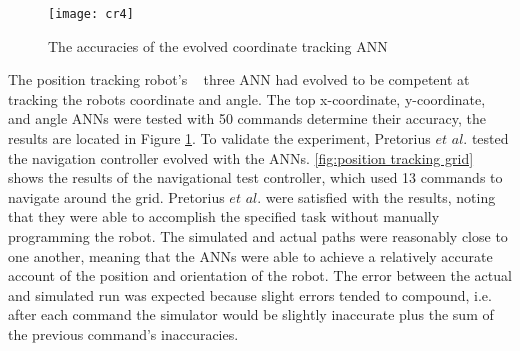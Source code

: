 \documentclass{sig-alternate}
\begin{document}
\begin{figure}%
\center
\caption{The accuracies of the evolved coordinate tracking ANN}

  \texttt{[image: cr4]}
\label{fig:ANNtable}
\end{figure}
	The  position tracking robot's ~\cite{Pretorius:2009:TAN:1632149.1632171} three ANN had evolved to be competent at tracking the robots coordinate and angle. The top x-coordinate, y-coordinate, and angle ANNs were tested with 50 commands determine their accuracy, the results are located in Figure \ref{fig:ANNtable}. To validate the experiment, Pretorius $et$ $al.$ tested the navigation controller evolved with the ANNs. \ref{fig:position tracking grid} shows the results of the navigational test controller, which used 13 commands to navigate around the grid. Pretorius $et$ $al.$ were satisfied with the results, noting that they were able to accomplish the specified task without  manually programming the robot. The simulated and actual paths were reasonably close to one another, meaning that the ANNs were able to achieve a relatively accurate account of the position and orientation of the robot. The error between the actual and simulated run was expected because slight errors tended to compound, i.e. after each command the simulator would be slightly inaccurate plus the sum of the previous command's inaccuracies. 
	
\end{document}
